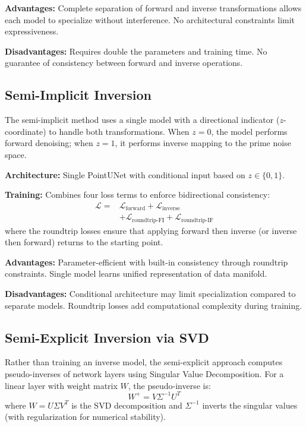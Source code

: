 \documentclass[sigconf]{acmart}
\begin{document}
\textbf{Advantages:} Complete separation of forward and inverse transformations allows each model to specialize without interference. No architectural constraints limit expressiveness.

\textbf{Disadvantages:} Requires double the parameters and training time. No guarantee of consistency between forward and inverse operations.

\subsection{Semi-Implicit Inversion}

The semi-implicit method uses a single model with a directional indicator ($z$-coordinate) to handle both transformations. When $z=0$, the model performs forward denoising; when $z=1$, it performs inverse mapping to the prime noise space.

\textbf{Architecture:} Single PointUNet with conditional input based on $z \in \{0, 1\}$.

\textbf{Training:} Combines four loss terms to enforce bidirectional consistency:
\begin{align}
\mathcal{L} = &\mathcal{L}_{\text{forward}} + \mathcal{L}_{\text{inverse}} \nonumber\\
&+ \mathcal{L}_{\text{roundtrip-FI}} + \mathcal{L}_{\text{roundtrip-IF}}
\end{align}
where the roundtrip losses ensure that applying forward then inverse (or inverse then forward) returns to the starting point.

\textbf{Advantages:} Parameter-efficient with built-in consistency through roundtrip constraints. Single model learns unified representation of data manifold.

\textbf{Disadvantages:} Conditional architecture may limit specialization compared to separate models. Roundtrip losses add computational complexity during training.

\subsection{Semi-Explicit Inversion via SVD}

Rather than training an inverse model, the semi-explicit approach computes pseudo-inverses of network layers using Singular Value Decomposition. For a linear layer with weight matrix $W$, the pseudo-inverse is:
\begin{equation}
W^+ = V\Sigma^{-1}U^T
\end{equation}
where $W = U\Sigma V^T$ is the SVD decomposition and $\Sigma^{-1}$ inverts the singular values (with regularization for numerical stability).
\end{document}
